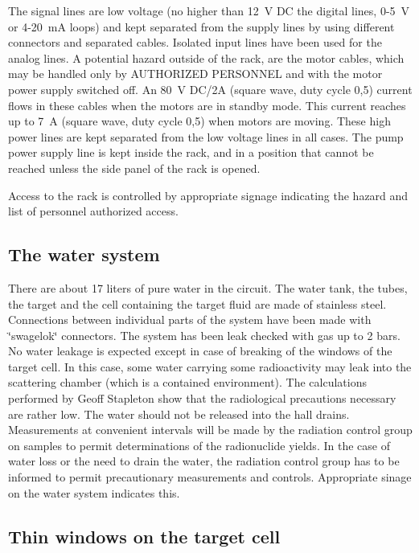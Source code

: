 The signal lines are low voltage (no higher than 12~V DC the digital
lines, 0-5~V or 4-20~mA loops) and kept separated from the supply
lines by using different connectors and separated cables. Isolated
input lines have been used for the analog lines. A potential hazard
outside of the rack, are the motor cables, which may be handled only
by AUTHORIZED PERSONNEL and with the motor power supply switched off.
An 80~V DC/2A (square wave, duty cycle 0,5) current flows in these
cables when the motors are in standby mode. This current reaches up
to 7~A (square wave, duty cycle 0,5) when motors are moving. These
high power lines are kept separated from the low voltage lines in
all cases. The pump power supply line is kept inside the rack, and
in a position that cannot be reached unless the side panel of the
rack is opened.

Access to the rack is controlled by appropriate signage indicating
the hazard and list of personnel authorized access.


\begin{safetyen}{10}{10}
\subsection{The water system}
\end{safetyen}

There are about 17 liters of pure water in the circuit. The water
tank, the tubes, the target and the cell containing the target fluid
are made of stainless steel. Connections between individual parts
of the system have been made with \char`\"{}swagelok\char`\"{} connectors.
The system has been leak checked with gas up to 2 bars. No water leakage
is expected except in case of breaking of the windows of the target
cell. In this case, some water carrying some radioactivity may leak
into the scattering chamber (which is a contained environment). The
calculations performed by Geoff Stapleton show that
the radiological precautions necessary are rather low. The water should
not be released into the hall drains. Measurements at convenient intervals
will be made by the radiation control group on samples to permit determinations
of the radionuclide yields. In the case of water loss or the need
to drain the water, the radiation control group has to be informed
to permit precautionary measurements and controls. Appropriate sinage
on the water system indicates this.

\begin{safetyen}{10}{10}
\subsection{Thin windows on the target cell}
\end{safetyen}

